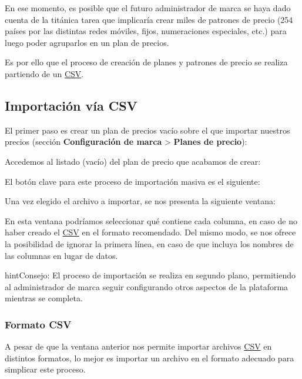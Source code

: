 \documentclass[letterpaper,10pt,spanish]{sphinxmanual}
\begin{document}
En ese momento, es posible que el futuro administrador de marca se haya dado cuenta de la titánica tarea que implicaría crear miles de patrones de precio (254 países por las distintas redes móviles, fijos, numeraciones especiales, etc.) para luego poder agruparlos en un plan de precios.

Es por ello que el proceso de creación de planes y patrones de precio se realiza partiendo de un \href{https://es.wikipedia.org/wiki/CSV}{CSV}.


\subsection{Importación vía CSV}
\label{billing_and_invoices/pricing_plans:importacion-via-csv}
El primer paso es crear un plan de precios vacío sobre el que importar nuestros precios (sección \textbf{Configuración de marca} \textgreater{} \textbf{Planes de precio}):

\noindent{}

Accedemos al listado (vacío) del plan de precio que acabamos de crear:

\noindent{}

El botón clave para este proceso de importación masiva es el siguiente:

\noindent{}

Una vez elegido el archivo a importar, se nos presenta la siguiente ventana:

\noindent{}

En esta ventana podríamos seleccionar qué contiene cada columna, en caso de no haber creado el \href{https://es.wikipedia.org/wiki/CSV}{CSV} en el formato recomendado. Del mismo modo, se nos ofrece la posibilidad de ignorar la primera línea, en caso de que incluya los nombres de las columnas en lugar de datos.

\begin{notice}{hint}{Consejo:}
El proceso de importación se realiza en segundo plano, permitiendo al administrador de marca seguir configurando otros aspectos de la plataforma mientras se completa.
\end{notice}


\subsubsection{Formato CSV}
\label{billing_and_invoices/pricing_plans:formato-csv}
A pesar de que la ventana anterior nos permite importar archivos \href{https://es.wikipedia.org/wiki/CSV}{CSV} en distintos formatos, lo mejor es importar un archivo en el formato adecuado para simplicar este proceso.
\end{document}
